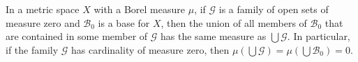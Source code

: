 In a metric space $X$ with a Borel measure $\mu$, if $\mathcal{G}$ is a family of open sets of measure zero and $\mathcal{B}_0$ is a base for $X$, then the union of all members of $\mathcal{B}_0$ that are contained in some member of $\mathcal{G}$ has the same measure as $\bigcup \mathcal{G}$. In particular, if the family $\mathcal{G}$ has cardinality of measure zero, then $\mu(\bigcup \mathcal{G}) = \mu(\bigcup \mathcal{B}_0) = 0$.
